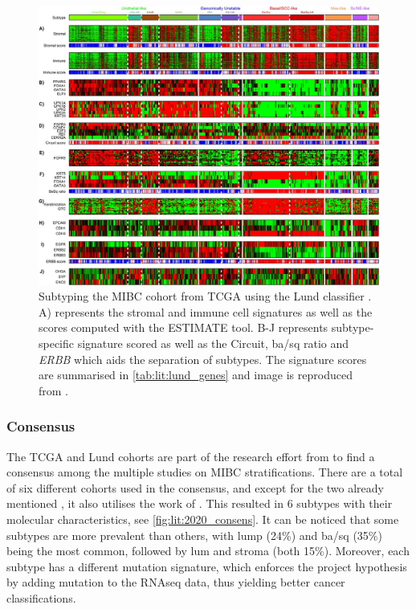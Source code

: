 \begin{figure}[!t]   
\centering
\includegraphics[width=1\textwidth,keepaspectratio]{Sections/Lit_review/Resources/Lung_subtypes.jpg}
  \caption[Summary of MIBC subtypes using Lund classifier]{Subtyping the MIBC cohort from TCGA using the Lund classifier \citep{Marzouka2018-ge}. A) represents the stromal and immune cell signatures as well as the scores computed with the ESTIMATE tool\citep{Yoshihara2013-wq}. B-J represents subtype-specific signature scored as well as the Circuit, \acrshort{ba/sq} ratio and \textit{ERBB} which aids the separation of subtypes. The signature scores are summarised in \cref{tab:lit:lund_genes} and image is reproduced from \citep{Marzouka2018-ge}.
}
\label{fig:lit:lund_fig}
\end{figure}
\FloatBarrier


\subsubsection*{Consensus} \label{s:lit:consensus_mibc}

The TCGA and Lund cohorts are part of the research effort from \citet{Kamoun2020-tj} to find a consensus among the multiple studies on MIBC stratifications. There are a total of six different cohorts used in the consensus, and except for the two already mentioned \citep{Kamoun2020-tj}, it also utilises the work of \citep{Mo2018-rl, Damrauer2014-tc, Choi2014-ed, Rebouissou2014-ep}. This resulted in 6 subtypes with their molecular characteristics, see \cref{fig:lit:2020_consens}. It can be noticed that some subtypes are more prevalent than others, with \acrfull{lump} (24\%) and \acrlong{ba/sq} (35\%) being the most common, followed by \acrlong{lum} and \acrlong{stroma} (both 15\%). Moreover, each subtype has a different mutation signature, which enforces the project hypothesis by adding mutation to the RNAseq data, thus yielding better cancer classifications.

